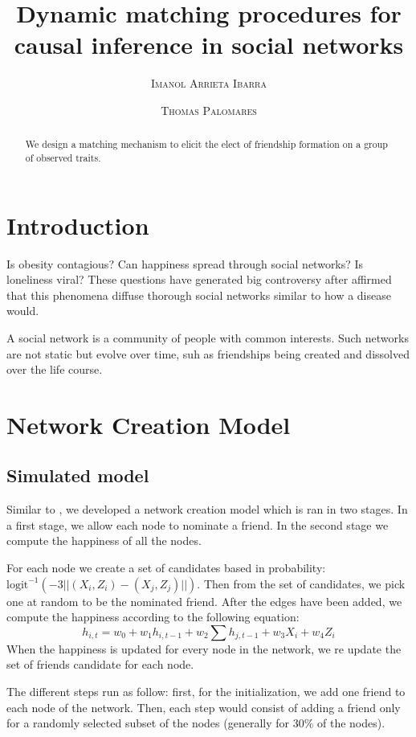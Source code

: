 \documentclass[11pt]{article}
\title{Dynamic matching procedures for causal inference in social networks}
\author{{\textsc{Imanol Arrieta Ibarra}} \\
 \and {\textsc{Thomas Palomares}} \\
}
\begin{document}
\maketitle


\begin{abstract}
We design a matching mechanism to elicit the elect of friendship formation on a group of observed traits.
\end{abstract}

\newpage

\section{Introduction}

Is obesity contagious? Can happiness spread through social networks? Is loneliness viral? These questions have generated big controversy after \cite{christakis2007spread} affirmed that this phenomena diffuse thorough social networks similar to how a disease would.

A social network is a community of people with common interests. Such networks are not static but evolve over time, suh as friendships being created and dissolved over the life course. 

\section{Network Creation Model}

\subsection{Simulated model}

Similar to \cite{christakis2007spread}, we developed a network creation model which is ran in two stages. In a first stage, we allow each node to nominate a friend. In the second stage we compute the happiness of all the nodes.

For each node we create a set of candidates based in probability: $\text{logit}^{-1} \left(-3||(X_i,Z_i)-(X_j,Z_j)||\right)$. Then from the set of candidates, we pick one at random to be the nominated friend. After the edges have been added, we compute the happiness according to the following equation:
$$h_{i,t} = w_0 +w_1 h_{i,t-1} + w_2\sum\limits h_{j,t-1} + w_3 X_{i} + w_4 Z_{i}$$
When the happiness is updated for every node in the network, we re update the set of friends candidate for each node.

The different steps run as follow: first, for the initialization, we add one friend to each node of the network. Then, each step would consist of adding a friend only for a randomly selected subset of the nodes (generally for 30\% of the nodes). 
\end{document}
